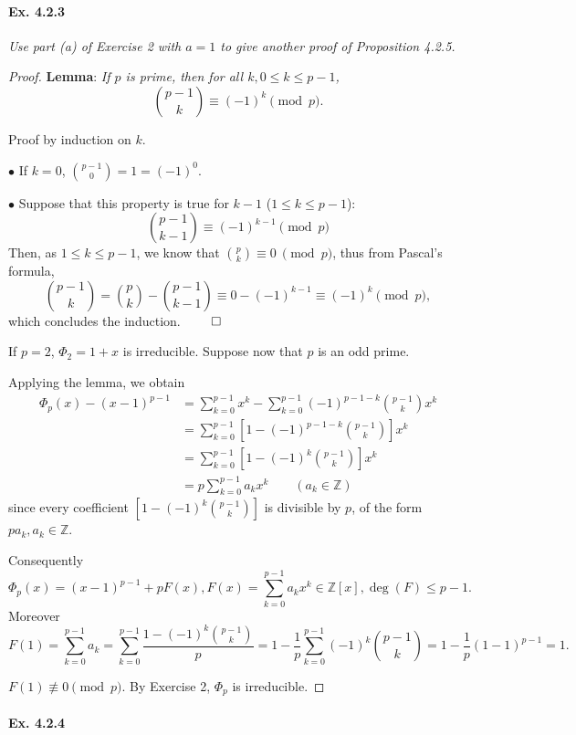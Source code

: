 \documentclass[11pt,a4paper]{article}
\newcommand{\Z}{\mathbb{Z}}
\begin{document}
\paragraph{Ex. 4.2.3}

{\it Use part (a) of Exercise 2 with $a=1$ to give another proof of Proposition 4.2.5.
}

\begin{proof}
{\bf Lemma}: {\it If $p$ is prime, then for all $k, 0\leq k \leq p-1$,
$$\binom{p-1}{k} \equiv (-1)^k \pmod p.$$}

Proof by induction on $k$.

$\bullet$ If $k=0$, $\binom{p-1}{0} = 1 = (-1)^0$.

$\bullet$ Suppose that this property is true for $k-1$ ($1\leq k \leq p-1$): 
$$\binom{p-1}{k-1} \equiv (-1)^{k-1} \pmod p$$
 Then, as $1\leq k \leq p-1$, we know that $\binom{p}{k} \equiv 0\  \pmod p$, thus from Pascal's formula,
$$\binom{p-1}{k} = \binom{p}{k} - \binom{p-1}{k-1} \equiv 0 - (-1)^{k-1} \equiv (-1)^{k} \pmod p,$$
which concludes the induction. $\qed$

If $p = 2$, $\Phi_2 = 1+x$ is irreducible. Suppose now that $p$ is an odd prime. 

Applying the lemma, we obtain
\begin{align*}
\Phi_p(x) - (x-1)^{p-1} &= \sum_{k=0}^{p-1} x^k -\sum_{k=0}^{p-1}(-1)^{p-1-k} \binom{p-1}{k} x^k\\
&=\sum_{k=0}^{p-1} \left[ 1 - (-1)^{p-1-k} \binom{p-1}{k} \right] x^k\\
&=\sum_{k=0}^{p-1} \left[ 1 - (-1)^{k} \binom{p-1}{k} \right] x^k\\
&=p \sum_{k=0}^{p-1} a_k x^k \qquad (a_k \in \Z)
\end{align*}
since every coefficient $\left[ 1 - (-1)^{k} \binom{p-1}{k} \right]$ is divisible by $p$, of the form $p a_k, a_k \in \mathbb{Z}$.

Consequently $$\Phi_p(x) = (x-1)^{p-1} + pF(x), F(x) = \sum_{k=0}^{p-1} a_k x^k \in \mathbb{Z}[x], \deg(F) \leq p-1.$$
Moreover 
$$F(1) = \sum_{k=0}^{p-1} a_k =  \sum_{k=0}^{p-1} \frac{ 1 - (-1)^{k} \binom{p-1}{k} }{p} = 1 -  \frac{1}{p} \sum_{k=0}^{p-1}(-1)^{k} \binom{p-1}{k} = 1 - \frac{1}{p}(1-1)^{p-1} = 1.$$

$F(1)\not \equiv 0 \pmod p$. By Exercise 2, $\Phi_p$ is irreducible.
\end{proof}

\paragraph{Ex. 4.2.4}
\end{document}
